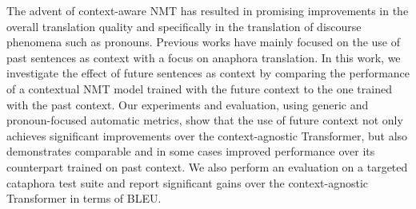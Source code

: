 The advent of context-aware NMT has resulted in promising improvements in the overall translation quality and specifically in the translation of discourse phenomena such as pronouns. Previous works have mainly focused on the use of past sentences as context with a focus on anaphora translation. In this work, we investigate the effect of future sentences as context by comparing the performance of a contextual NMT model trained with the future context to the one trained with the past context. Our experiments and evaluation, using generic and pronoun-focused automatic metrics, show that the use of future context not only achieves significant improvements over the context-agnostic Transformer, but also demonstrates comparable and in some cases improved performance over its counterpart trained on past context. We also perform an evaluation on a targeted cataphora test suite and report significant gains over the context-agnostic Transformer in terms of BLEU.
